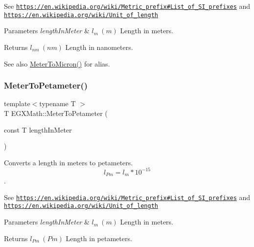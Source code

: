 See \href{https://en.wikipedia.org/wiki/Metric_prefix#List_of_SI_prefixes}{\tt https\+://en.\+wikipedia.\+org/wiki/\+Metric\+\_\+prefix\#\+List\+\_\+of\+\_\+\+S\+I\+\_\+prefixes} and \href{https://en.wikipedia.org/wiki/Unit_of_length}{\tt https\+://en.\+wikipedia.\+org/wiki/\+Unit\+\_\+of\+\_\+length} 
\begin{DoxyParams}{Parameters}
{\em length\+In\+Meter} & $ l_{m}\ (m)$ Length in meters. \\
\hline
\end{DoxyParams}
\begin{DoxyReturn}{Returns}
$ l_{nm}\ (nm)$ Length in nanometers. 
\end{DoxyReturn}
\begin{DoxySeeAlso}{See also}
\mbox{\hyperlink{group___e_g_x_math-_conversions-_length_conversions-_meter-_non-_s_i_ga9655833d43ede59b17c54a6f06f9681a}{Meter\+To\+Micron()}} for alias. 
\end{DoxySeeAlso}
\mbox{\label{group___e_g_x_math-_conversions-_length_conversions-_meter-_s_i_gaf808f7191ee069df013a26281f227388}} 
\subsubsection{\texorpdfstring{Meter\+To\+Petameter()}{MeterToPetameter()}}
{\footnotesize\ttfamily template$<$typename T $>$ \\
T E\+G\+X\+Math\+::\+Meter\+To\+Petameter (\begin{DoxyParamCaption}\item[{const T}]{length\+In\+Meter }\end{DoxyParamCaption})}



Converts a length in meters to petameters. \[ l_{Pm}=l_{m} * 10^{-15} \]. 

See \href{https://en.wikipedia.org/wiki/Metric_prefix#List_of_SI_prefixes}{\tt https\+://en.\+wikipedia.\+org/wiki/\+Metric\+\_\+prefix\#\+List\+\_\+of\+\_\+\+S\+I\+\_\+prefixes} and \href{https://en.wikipedia.org/wiki/Unit_of_length}{\tt https\+://en.\+wikipedia.\+org/wiki/\+Unit\+\_\+of\+\_\+length} 
\begin{DoxyParams}{Parameters}
{\em length\+In\+Meter} & $ l_{m}\ (m)$ Length in meters. \\
\hline
\end{DoxyParams}
\begin{DoxyReturn}{Returns}
$ l_{Pm}\ (Pm)$ Length in petameters. 
\end{DoxyReturn}
\mbox{\label{group___e_g_x_math-_conversions-_length_conversions-_meter-_s_i_ga5e136454c20254062d6e8637cfbfb8ee}} 
